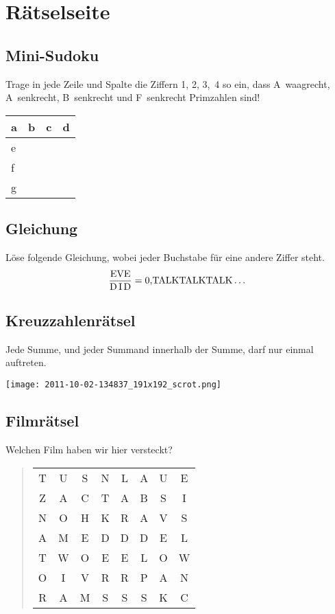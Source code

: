 ﻿\chapter{Rätselseite}

\raggedcolumns
\begin{multicols}{2}
	\section*{Mini-Sudoku}
	Trage in jede Zeile und Spalte die Ziffern 1, 2, 3,~4 so ein, dass A~waagrecht, A~senkrecht, B~senkrecht und F~senkrecht Primzahlen sind!

	\begin{center}
		\begin{tabular}{ |p{0.8cm}|p{0.8cm}|p{0.8cm}|p{0.8cm}| }
		\hline
		  a & b & c & d \\[0.8cm]
		\hline
		  e &   &   &   \\[0.8cm]
		\hline
		  f &   &   &   \\[0.8cm]
		\hline
		  g &   &   &   \\[0.8cm]
		\hline
		\end{tabular}
	\end{center}

	\section*{Gleichung}
	Löse folgende Gleichung, wobei jeder Buchstabe für eine andere Ziffer steht.
	\[\frac{\textrm{EVE}}{\textrm{D\,I\,D}} = \textrm{0,TALKTALKTALK}\dots\]

		\columnbreak
		\columnbreak
	\section*{Kreuzzahlenrätsel}
	Jede Summe, und jeder Summand innerhalb der Summe, darf nur einmal auftreten.

	\texttt{[image: 2011-10-02-134837\_191x192\_scrot.png]}

	\section*{Filmrätsel}
	Welchen Film haben wir hier versteckt?
	\begin{quote}
		\begin{tabular}{cccccccc}
			T & U & S & N & L & A & U & E \\
			Z & A & C & T & A & B & S & I \\
			N & O & H & K & R & A & V & S \\
			A & M & E & D & D & D & E & L \\
			T & W & O & E & E & L & O & W \\
			O & I & V & R & R & P & A & N \\
			R & A & M & S & S & S & K & C \\
		\end{tabular}
	\end{quote} 

	\end{multicols}
